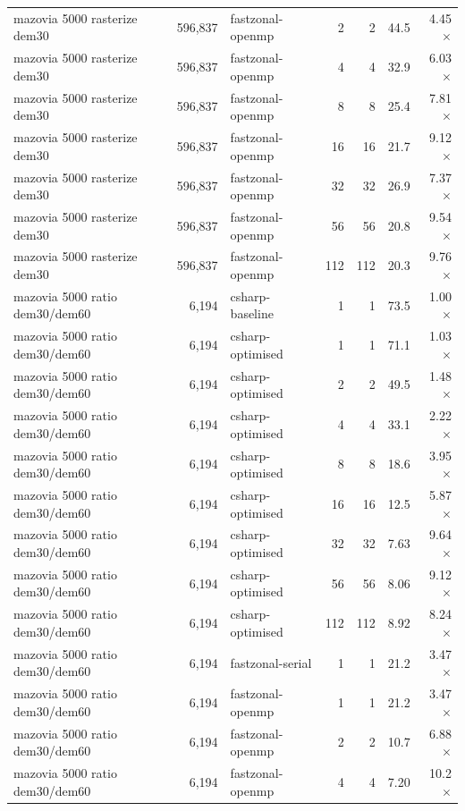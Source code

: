 \begin{tabular}{lrlrrrr}
mazovia 5000 rasterize dem30 & 596,837 & fastzonal-openmp & 2 & 2 & 44.5 & 4.45$\times$ \\
mazovia 5000 rasterize dem30 & 596,837 & fastzonal-openmp & 4 & 4 & 32.9 & 6.03$\times$ \\
mazovia 5000 rasterize dem30 & 596,837 & fastzonal-openmp & 8 & 8 & 25.4 & 7.81$\times$ \\
mazovia 5000 rasterize dem30 & 596,837 & fastzonal-openmp & 16 & 16 & 21.7 & 9.12$\times$ \\
mazovia 5000 rasterize dem30 & 596,837 & fastzonal-openmp & 32 & 32 & 26.9 & 7.37$\times$ \\
mazovia 5000 rasterize dem30 & 596,837 & fastzonal-openmp & 56 & 56 & 20.8 & 9.54$\times$ \\
mazovia 5000 rasterize dem30 & 596,837 & fastzonal-openmp & 112 & 112 & 20.3 & 9.76$\times$ \\
mazovia 5000 ratio dem30/dem60 & 6,194 & csharp-baseline & 1 & 1 & 73.5 & 1.00$\times$ \\
mazovia 5000 ratio dem30/dem60 & 6,194 & csharp-optimised & 1 & 1 & 71.1 & 1.03$\times$ \\
mazovia 5000 ratio dem30/dem60 & 6,194 & csharp-optimised & 2 & 2 & 49.5 & 1.48$\times$ \\
mazovia 5000 ratio dem30/dem60 & 6,194 & csharp-optimised & 4 & 4 & 33.1 & 2.22$\times$ \\
mazovia 5000 ratio dem30/dem60 & 6,194 & csharp-optimised & 8 & 8 & 18.6 & 3.95$\times$ \\
mazovia 5000 ratio dem30/dem60 & 6,194 & csharp-optimised & 16 & 16 & 12.5 & 5.87$\times$ \\
mazovia 5000 ratio dem30/dem60 & 6,194 & csharp-optimised & 32 & 32 & 7.63 & 9.64$\times$ \\
mazovia 5000 ratio dem30/dem60 & 6,194 & csharp-optimised & 56 & 56 & 8.06 & 9.12$\times$ \\
mazovia 5000 ratio dem30/dem60 & 6,194 & csharp-optimised & 112 & 112 & 8.92 & 8.24$\times$ \\
mazovia 5000 ratio dem30/dem60 & 6,194 & fastzonal-serial & 1 & 1 & 21.2 & 3.47$\times$ \\
mazovia 5000 ratio dem30/dem60 & 6,194 & fastzonal-openmp & 1 & 1 & 21.2 & 3.47$\times$ \\
mazovia 5000 ratio dem30/dem60 & 6,194 & fastzonal-openmp & 2 & 2 & 10.7 & 6.88$\times$ \\
mazovia 5000 ratio dem30/dem60 & 6,194 & fastzonal-openmp & 4 & 4 & 7.20 & 10.2$\times$ \\

\end{tabular}
